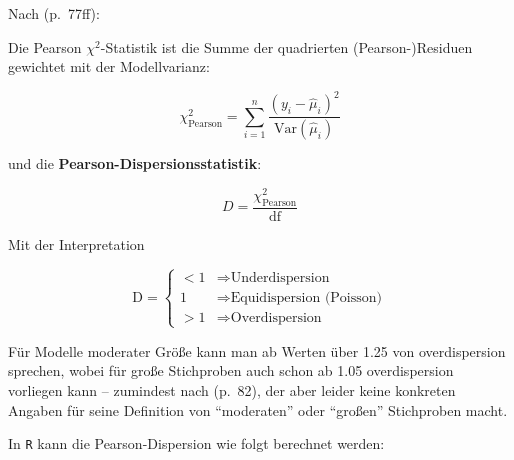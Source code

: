 \documentclass[ngerman,a4paper,]{scrartcl}
\newenvironment{Shaded}{\begin{snugshade}}{\end{snugshade}}
\newcommand{\CommentTok}[1]{\textcolor[rgb]{0.56,0.35,0.01}{\textit{#1}}}
\newcommand{\DataTypeTok}[1]{\textcolor[rgb]{0.13,0.29,0.53}{#1}}
\newcommand{\DecValTok}[1]{\textcolor[rgb]{0.00,0.00,0.81}{#1}}
\newcommand{\KeywordTok}[1]{\textcolor[rgb]{0.13,0.29,0.53}{\textbf{#1}}}
\newcommand{\NormalTok}[1]{#1}
\newcommand{\OperatorTok}[1]{\textcolor[rgb]{0.81,0.36,0.00}{\textbf{#1}}}
\newcommand{\StringTok}[1]{\textcolor[rgb]{0.31,0.60,0.02}{#1}}
\theoremstyle{definition}
\theoremstyle{definition}
\theoremstyle{definition}
\theoremstyle{remark}
\let\BeginKnitrBlock\begin \let\EndKnitrBlock\end
\begin{document}
\BeginKnitrBlock{definition}[Pearson-Dispersion]
\protect\hypertarget{def:def-pearsondisp}{}{\label{def:def-pearsondisp} \iffalse (Pearson-Dispersion) \fi{} }Nach \citet{hilbeModelingCountData2014} (p.~77ff):

Die Pearson \(\chi^2\)-Statistik ist die Summe der quadrierten (Pearson-)Residuen gewichtet mit der Modellvarianz:

\begin{equation*}
\chi_{\text{Pearson}}^2 = \sum_{i=1}^n \frac{(y_i - \hat{\mu}_i)^2}{\mathrm{Var}(\hat{\mu}_i)}
\end{equation*}

und die \textbf{Pearson-Dispersionsstatistik}:

\begin{equation*}
D = \frac{\chi_{\text{Pearson}}^2}{\mathrm{df}}
\end{equation*}

Mit der Interpretation

\begin{equation*}
\mathrm{D} =
  \begin{cases}
    < 1 & \Longrightarrow \text{Underdispersion} \\
      1 & \Longrightarrow \text{Equidispersion (Poisson)} \\
    > 1 & \Longrightarrow \text{Overdispersion}
  \end{cases}
\end{equation*}

Für Modelle moderater Größe kann man ab Werten über 1.25 von overdispersion sprechen, wobei für große Stichproben auch schon ab 1.05 overdispersion vorliegen kann -- zumindest nach \citet{hilbeModelingCountData2014} (p.~82), der aber leider keine konkreten Angaben für seine Definition von \enquote{moderaten} oder \enquote{großen} Stichproben macht.
\EndKnitrBlock{definition}

In \texttt{R} kann die Pearson-Dispersion wie folgt berechnet werden:

\begin{Shaded}
\end{Shaded}
\end{document}
